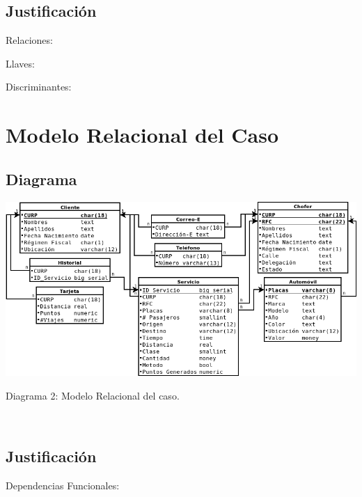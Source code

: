 \documentclass{article}
\begin{document}
       \subsection{Justificación}

       Relaciones:
       \begin{itemize}

       \end{itemize}

       Llaves:
       \begin{itemize}

       \end{itemize}

       Discriminantes:
       \begin{itemize}

       \end{itemize}

       \section{Modelo Relacional del Caso}

       \subsection{Diagrama}

       \includegraphics[width=15cm]{R.png}\\
       \centerline{Diagrama 2: Modelo Relacional del caso.}\\

       \subsection{Justificación}

       Dependencias Funcionales:
       \begin{itemize}

       \end{itemize}
\end{document}
